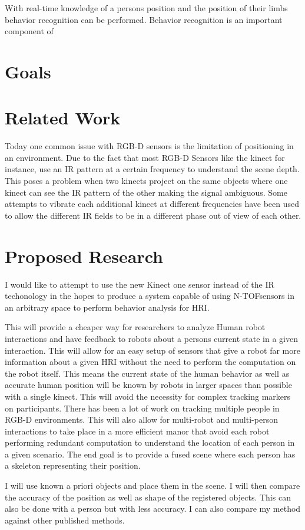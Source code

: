 \documentclass[12pt,a4paper]{article}
\begin{document}
With real-time knowledge of a persons position and the position of their limbs behavior recognition can be performed\cite{journals/ijsr/MeadAM13}. Behavior recognition is an important component of 
\section{Goals}
\section{Related Work}
Today one common issue with RGB-D sensors is the limitation of positioning in an environment. Due to the fact that most RGB-D Sensors like the kinect for instance, use an IR pattern at a certain frequency to understand the scene depth. This poses a problem when two kinects project on the same objects where one kinect can see the IR pattern of the other making the signal ambiguous. Some attempts to vibrate each additional kinect at different frequencies have been used to allow the different IR fields to be in a different phase out of view of each other.
\section{Proposed Research}
I would like to attempt to use the new Kinect one sensor instead of the IR techonology in the hopes to produce a system capable of using N-TOFsensors in an arbitrary space to perform behavior analysis for HRI.

This will provide a cheaper way for researchers to analyze Human robot interactions and have feedback to robots about a persons current state in a given interaction. This will allow for an easy setup of sensors that give a robot far more information about a given HRI without the need to perform the computation on the robot itself. This means the current state of the human behavior as well as accurate human position will be known by robots in larger spaces than possible with a single kinect. This will avoid the necessity for complex tracking markers on participants. There has been a lot of work on tracking multiple people in RGB-D environments. This will also allow for multi-robot and multi-person interactions to take place in a more efficient manor that avoid each robot performing redundant computation to understand the location of each person in a given scenario. The end goal is to provide a fused scene where each person has a skeleton representing their position.

I will use known a priori objects and place them in the scene. I will then compare the accuracy of the position as well as shape of the registered objects. This can also be done with a person but with less accuracy. I can also compare my method against other published methods.
\end{document}

